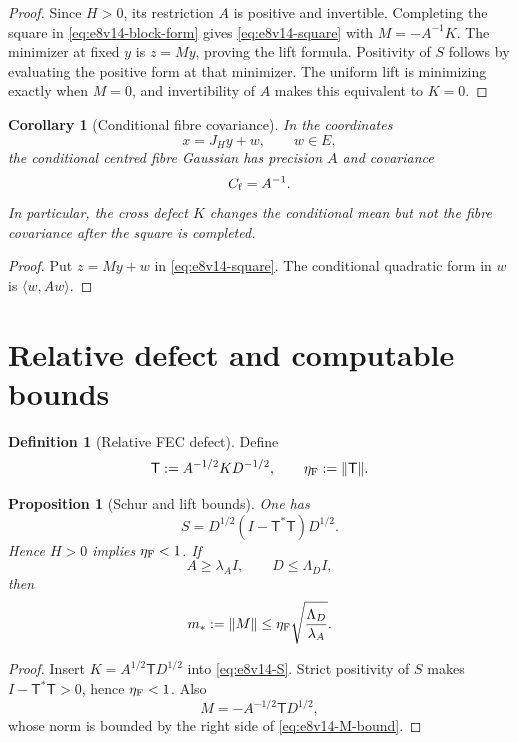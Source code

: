 \documentclass[11pt,oneside]{book}
\newtheorem{proposition}[theorem]{Proposition}
\newtheorem{corollary}[theorem]{Corollary}
\theoremstyle{definition}
\newtheorem{definition}[theorem]{Definition}
\theoremstyle{remark}
\begin{document}
\begin{proof}
Since \(H>0\), its restriction \(A\) is positive and invertible.
Completing the square in \eqref{eq:e8v14-block-form} gives
\eqref{eq:e8v14-square} with \(M=-A^{-1}K\).  The minimizer at fixed
\(y\) is \(z=My\), proving the lift formula.  Positivity of \(S\)
follows by evaluating the positive form at that minimizer.  The
uniform lift is minimizing exactly when \(M=0\), and invertibility of
\(A\) makes this equivalent to \(K=0\).
\end{proof}

\begin{corollary}[Conditional fibre covariance]
\label{cor:e8v14-Cf}
In the coordinates
\[
 x=J_Hy+w,\qquad w\in E,                            \label{eq:e8v14-JH-coordinates}
\]
the conditional centred fibre Gaussian has precision \(A\) and
covariance
\[
 C_{\rm f}=A^{-1}.                                  \label{eq:e8v14-Cf}
\]
In particular, the cross defect \(K\) changes the conditional mean
but not the fibre covariance after the square is completed.
\end{corollary}

\begin{proof}
Put \(z=My+w\) in \eqref{eq:e8v14-square}.  The conditional quadratic
form in \(w\) is \(\langle w,Aw\rangle\).
\end{proof}

\section{Relative defect and computable bounds}
\label{sec:e8v14-relative}

\begin{definition}[Relative FEC defect]
\label{def:e8v14-eta}
Define
\[
 {\mathsf T}:=A^{-1/2}KD^{-1/2},\qquad
 \eta_{\rm F}:=\|{\mathsf T}\|.                     \label{eq:e8v14-eta}
\]
\end{definition}

\begin{proposition}[Schur and lift bounds]
\label{prop:e8v14-bounds}
One has
\[
 S=D^{1/2}(I-{\mathsf T}^*{\mathsf T})D^{1/2}.      \label{eq:e8v14-relative-S}
\]
Hence \(H>0\) implies \(\eta_{\rm F}<1\).  If
\[
 A\ge\lambda_AI,\qquad D\le\Lambda_DI,              \label{eq:e8v14-windows}
\]
then
\[
 m_*:=\|M\|
 \le\eta_{\rm F}\sqrt{\frac{\Lambda_D}{\lambda_A}}. \label{eq:e8v14-M-bound}
\]
\end{proposition}

\begin{proof}
Insert \(K=A^{1/2}{\mathsf T}D^{1/2}\) into
\eqref{eq:e8v14-S}.  Strict positivity of \(S\) makes
\(I-{\mathsf T}^*{\mathsf T}>0\), hence
\(\eta_{\rm F}<1\).  Also
\[
 M=-A^{-1/2}{\mathsf T}D^{1/2},
\]
whose norm is bounded by the right side of
\eqref{eq:e8v14-M-bound}.
\end{proof}
\end{document}
